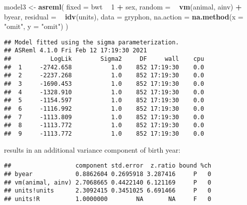 \documentclass[12pt,]{book}
\newenvironment{Shaded}{\begin{snugshade}}{\end{snugshade}}
\newcommand{\DataTypeTok}[1]{\textcolor[rgb]{0.13,0.29,0.53}{#1}}
\newcommand{\DecValTok}[1]{\textcolor[rgb]{0.00,0.00,0.81}{#1}}
\newcommand{\KeywordTok}[1]{\textcolor[rgb]{0.13,0.29,0.53}{\textbf{#1}}}
\newcommand{\NormalTok}[1]{#1}
\newcommand{\OperatorTok}[1]{\textcolor[rgb]{0.81,0.36,0.00}{\textbf{#1}}}
\newcommand{\StringTok}[1]{\textcolor[rgb]{0.31,0.60,0.02}{#1}}
\begin{document}
\begin{Shaded}
\begin{Highlighting}[]
\NormalTok{model3 <-}\StringTok{ }\KeywordTok{asreml}\NormalTok{(}
  \DataTypeTok{fixed =}\NormalTok{ bwt }\OperatorTok{~}\StringTok{ }\DecValTok{1} \OperatorTok{+}\StringTok{ }\NormalTok{sex,}
  \DataTypeTok{random =} \OperatorTok{~}\StringTok{ }\KeywordTok{vm}\NormalTok{(animal, ainv) }\OperatorTok{+}\StringTok{ }\NormalTok{byear,}
  \DataTypeTok{residual =} \OperatorTok{~}\StringTok{ }\KeywordTok{idv}\NormalTok{(units),}
  \DataTypeTok{data =}\NormalTok{ gryphon,}
  \DataTypeTok{na.action =} \KeywordTok{na.method}\NormalTok{(}\DataTypeTok{x =} \StringTok{"omit"}\NormalTok{, }\DataTypeTok{y =} \StringTok{"omit"}\NormalTok{)}
\NormalTok{)}
\end{Highlighting}
\end{Shaded}

\begin{verbatim}
## Model fitted using the sigma parameterization.
## ASReml 4.1.0 Fri Feb 12 17:19:30 2021
##           LogLik        Sigma2     DF     wall    cpu
##  1     -2742.658           1.0    852 17:19:30    0.0
##  2     -2237.268           1.0    852 17:19:30    0.0
##  3     -1690.453           1.0    852 17:19:30    0.0
##  4     -1328.910           1.0    852 17:19:30    0.0
##  5     -1154.597           1.0    852 17:19:30    0.0
##  6     -1116.992           1.0    852 17:19:30    0.0
##  7     -1113.809           1.0    852 17:19:30    0.0
##  8     -1113.772           1.0    852 17:19:30    0.0
##  9     -1113.772           1.0    852 17:19:30    0.0
\end{verbatim}

results in an additional variance component of birth year:

\begin{Shaded}
\end{Shaded}

\begin{verbatim}
##                  component std.error  z.ratio bound %ch
## byear            0.8862604 0.2695918 3.287416     P   0
## vm(animal, ainv) 2.7068665 0.4422140 6.121169     P   0
## units!units      2.3092415 0.3451025 6.691466     P   0
## units!R          1.0000000        NA       NA     F   0
\end{verbatim}
\end{document}
